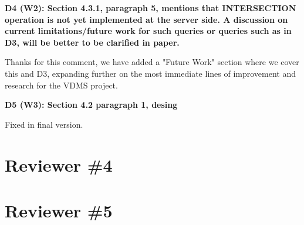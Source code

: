 \documentclass[11pt]{proposalnsf}
\begin{document}
\bigskip
\textbf{
D4 (W2): Section 4.3.1, paragraph 5, mentions that INTERSECTION operation is not
yet implemented at the server side.
A discussion on current limitations/future work for such queries or queries
such as in D3, will be better to be clarified in paper.
}\bigskip

Thanks for this comment, we have added a "Future Work" section where we cover
this and D3, expanding further on the most immediate lines of
improvement and research for the VDMS project.

\bigskip
\textbf{
D5 (W3): Section 4.2 paragraph 1, desing
}\bigskip

Fixed in final version.

\bigskip

\newpage
\section{Reviewer \#4}

\newpage
\section{Reviewer \#5}

\end{document}
